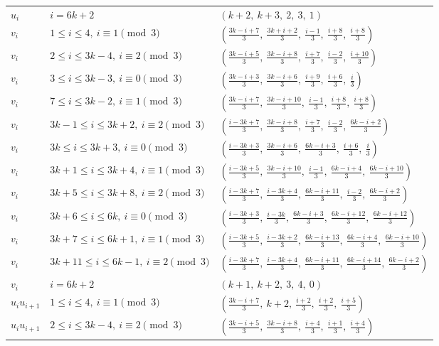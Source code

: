 \begin{longtable}{lll}
$u_i$ & $i = 6k+2$ & $(k+2,\ k+3,\ 2,\ 3,\ 1)$ \\
$v_i$ & $1 \le i \le 4,\ i \equiv 1 \pmod{3}$ & $(\frac{3k-i+7}{3},\ \frac{3k+i+2}{3},\ \frac{i-1}{3},\ \frac{i+8}{3},\ \frac{i+8}{3})$ \\
$v_i$ & $2 \le i \le 3k-4,\ i \equiv 2 \pmod{3}$ & $(\frac{3k-i+5}{3},\ \frac{3k-i+8}{3},\ \frac{i+7}{3},\ \frac{i-2}{3},\ \frac{i+10}{3})$ \\
$v_i$ & $3 \le i \le 3k-3,\ i \equiv 0 \pmod{3}$ & $(\frac{3k-i+3}{3},\ \frac{3k-i+6}{3},\ \frac{i+9}{3},\ \frac{i+6}{3},\ \frac{i}{3})$ \\
$v_i$ & $7 \le i \le 3k-2,\ i \equiv 1 \pmod{3}$ & $(\frac{3k-i+7}{3},\ \frac{3k-i+10}{3},\ \frac{i-1}{3},\ \frac{i+8}{3},\ \frac{i+8}{3})$ \\
$v_i$ & $3k-1 \le i \le 3k+2,\ i \equiv 2 \pmod{3}$ & $(\frac{i-3k+7}{3},\ \frac{3k-i+8}{3},\ \frac{i+7}{3},\ \frac{i-2}{3},\ \frac{6k-i+2}{3})$ \\
$v_i$ & $3k \le i \le 3k+3,\ i \equiv 0 \pmod{3}$ & $(\frac{i-3k+3}{3},\ \frac{3k-i+6}{3},\ \frac{6k-i+3}{3},\ \frac{i+6}{3},\ \frac{i}{3})$ \\
$v_i$ & $3k+1 \le i \le 3k+4,\ i \equiv 1 \pmod{3}$ & $(\frac{i-3k+5}{3},\ \frac{3k-i+10}{3},\ \frac{i-1}{3},\ \frac{6k-i+4}{3},\ \frac{6k-i+10}{3})$ \\
$v_i$ & $3k+5 \le i \le 3k+8,\ i \equiv 2 \pmod{3}$ & $(\frac{i-3k+7}{3},\ \frac{i-3k+4}{3},\ \frac{6k-i+11}{3},\ \frac{i-2}{3},\ \frac{6k-i+2}{3})$ \\
$v_i$ & $3k+6 \le i \le 6k,\ i \equiv 0 \pmod{3}$ & $(\frac{i-3k+3}{3},\ \frac{i-3k}{3},\ \frac{6k-i+3}{3},\ \frac{6k-i+12}{3},\ \frac{6k-i+12}{3})$ \\
$v_i$ & $3k+7 \le i \le 6k+1,\ i \equiv 1 \pmod{3}$ & $(\frac{i-3k+5}{3},\ \frac{i-3k+2}{3},\ \frac{6k-i+13}{3},\ \frac{6k-i+4}{3},\ \frac{6k-i+10}{3})$ \\
$v_i$ & $3k+11 \le i \le 6k-1,\ i \equiv 2 \pmod{3}$ & $(\frac{i-3k+7}{3},\ \frac{i-3k+4}{3},\ \frac{6k-i+11}{3},\ \frac{6k-i+14}{3},\ \frac{6k-i+2}{3})$ \\
$v_i$ & $i = 6k+2$ & $(k+1,\ k+2,\ 3,\ 4,\ 0)$ \\
$u_i u_{i+1}$ & $1 \le i \le 4,\ i \equiv 1 \pmod{3}$ & $(\frac{3k-i+7}{3},\ k+2,\ \frac{i+2}{3},\ \frac{i+2}{3},\ \frac{i+5}{3})$ \\
$u_i u_{i+1}$ & $2 \le i \le 3k-4,\ i \equiv 2 \pmod{3}$ & $(\frac{3k-i+5}{3},\ \frac{3k-i+8}{3},\ \frac{i+4}{3},\ \frac{i+1}{3},\ \frac{i+4}{3})$ \\

\end{longtable}
